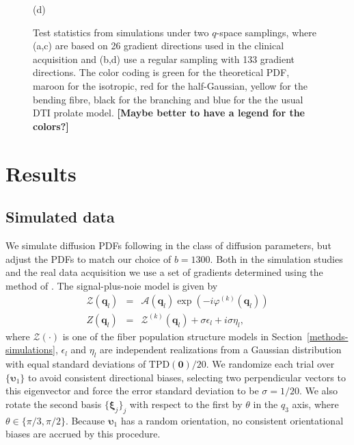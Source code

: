 \documentclass[authoryear,preprint,12pt]{elsarticle}
\newcommand{\q}{\mathbf{q}}
\newcommand{\bsu}{\bs{\upsilon}}
\newcommand{\cA}{\mathcal{A}}
\newcommand{\cZ}{\mathcal{Z}}
\newcommand{\bld}[1]{\mathbf{#1}}
\newcommand{\bs}[1]{\boldsymbol{#1}}
\begin{document}
\begin{figure}[!htbp]
\begin{center}
\begin{minipage}[]{0.45\textwidth}
      (d)
    \end{minipage}
  \end{center}
  \caption{Test statistics from simulations under two $q$-space
    samplings, where (a,c) are based on 26 gradient directions used in
    the clinical acquisition and (b,d) use a regular sampling with 133
    gradient directions.  The color coding is green for the
    theoretical PDF, maroon for the isotropic, red for the
    half-Gaussian, yellow for the bending fibre, black for the
    branching and blue for the the usual DTI prolate model.
    \textbf{[Maybe better to have a legend for the colors?]}}
  \label{fig-0.5}
\end{figure}

\section{Results}
\label{results}
\subsection{Simulated data}

We simulate diffusion PDFs following \citet{Alexander2005} in the
class of diffusion parameters, but adjust the PDFs to match our choice
of $b=1300$.  Both in the simulation studies and the real data
acquisition we use a set of gradients determined using the method of
\cite{DKJones99}.  The signal-plus-noie model is given by
\begin{eqnarray}
  \cZ(\q_l) &=& \cA(\q_l) \exp\left(-i\varphi^{(k)}(\q_l)\right)\\
  Z(\q_l) &=& \cZ^{(k)}(\q_l) + \sigma\epsilon_l + i\sigma\eta_l,
\end{eqnarray}
where $\cZ(\cdot)$ is one of the fiber population structure models in
Section~\ref{methods-simulations}, $\epsilon_l$ and $\eta_l$ are
independent realizations from a Gaussian distribution with equal
standard deviations of $\text{TPD}(\bld{0})/20$.  We randomize each
trial over $\{\bsu_1\}$ to avoid consistent directional biases,
selecting two perpendicular vectors to this eigenvector and force the
error standard deviation to be $\sigma=1/20$.  We also rotate the
second basis $\{\bs{\xi}_j\}_j$ with respect to the first by $\theta$
in the $q_3$ axis, where $\theta\in\{\pi/3,\pi/2\}$.  Because $\bsu_1$
has a random orientation, no consistent orientational biases are
accrued by this procedure.
\end{document}
